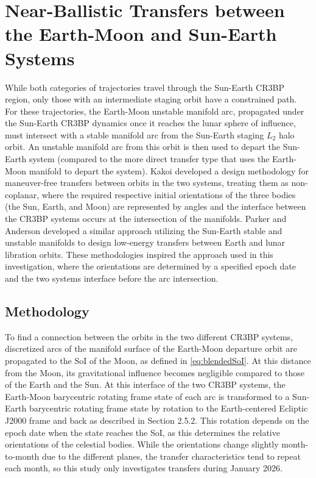 \section{Near-Ballistic Transfers between the Earth-Moon and Sun-Earth Systems}
While both categories of trajectories travel through the Sun-Earth CR3BP region, only those with an
intermediate staging orbit have a constrained path. For these trajectories, the Earth-Moon unstable
manifold arc, propagated under the Sun-Earth CR3BP dynamics once it reaches the lunar sphere of
influence, must intersect with a stable manifold arc from the Sun-Earth staging $L_{2}$ halo orbit.
An unstable manifold arc from this orbit is then used to depart the Sun-Earth system (compared to
the more direct transfer type that uses the Earth-Moon manifold to depart the system). Kakoi
developed a design methodology for maneuver-free transfers between orbits in the two systems,
treating them as non-coplanar, where the required respective initial orientations of the three
bodies (the Sun, Earth, and Moon) are represented by angles and the interface between the CR3BP
systems occurs at the intersection of the manifolds\cite{Kakoi:2014,Kakoi:2015}. Parker and
Anderson developed a similar approach utilizing the Sun-Earth stable and unstable manifolds to
design low-energy transfers between Earth and lunar libration orbits\cite{Parker:2013}. These
methodologies inspired the approach used in this investigation, where the orientations are
determined by a specified epoch date and the two systems interface before the arc intersection.

\subsection{Methodology}
To find a connection between the orbits in the two different CR3BP systems, discretized arcs of the
manifold surface of the Earth-Moon departure orbit are propagated to the SoI of the Moon, as
defined in \cref{eq:blendedSoI}. At this distance from the Moon, its gravitational influence
becomes negligible compared to those of the Earth and the Sun. At this interface of the two CR3BP
systems, the Earth-Moon barycentric rotating frame state of each arc is transformed to a Sun-Earth
barycentric rotating frame state by rotation to the Earth-centered Ecliptic J2000 frame and back as
described in Section 2.5.2. This rotation depends on the epoch date when the state reaches the SoI,
as this determines the relative orientations of the celestial bodies. While the orientations change
slightly month-to-month due to the different planes, the transfer characteristics tend to repeat
each month, so this study only investigates transfers during January 2026\cite{Parker:2013}.

